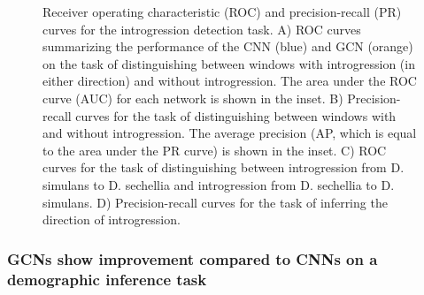 \begin{figure}
    \centering
    \caption[Receiver operating characteristic (ROC) and precision-recall (PR) curves for the introgression detection task]{Receiver operating characteristic (ROC) and precision-recall (PR) curves for the introgression detection task. A) ROC curves summarizing the performance of the CNN (blue) and GCN (orange) on the task of distinguishing between windows with introgression (in either direction) and without introgression. The area under the ROC curve (AUC) for each network is shown in the inset. B) Precision-recall curves for the task of distinguishing between windows with and without introgression. The average precision (AP, which is equal to the area under the PR curve) is shown in the inset. C) ROC curves for the task of distinguishing between introgression from D. simulans to D. sechellia and introgression from D. sechellia to D. simulans. D) Precision-recall curves for the task of inferring the direction of introgression.}
    \label{fig:enter-label}
\end{figure}

\subsubsection{GCNs show improvement compared to CNNs on a demographic inference task}

